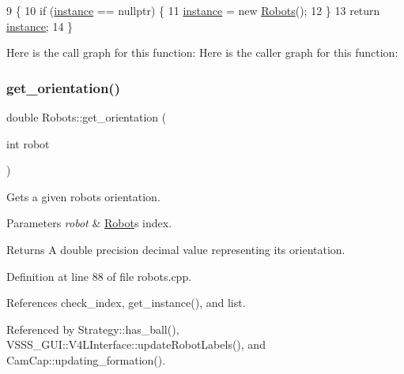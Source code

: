 \begin{DoxyCode}
9                              \{
10     \textcolor{keywordflow}{if} (\hyperlink{class_robots_acd8ab9afe75178be7d696cf2c1b96056}{instance} == \textcolor{keyword}{nullptr}) \{
11         \hyperlink{class_robots_acd8ab9afe75178be7d696cf2c1b96056}{instance} = \textcolor{keyword}{new} \hyperlink{class_robots_aa2745a48ebd3e52b9a3020f6afbcb25d}{Robots}();
12     \}
13     \textcolor{keywordflow}{return} \hyperlink{class_robots_acd8ab9afe75178be7d696cf2c1b96056}{instance};
14 \}
\end{DoxyCode}
Here is the call graph for this function\+:
Here is the caller graph for this function\+:
\mbox{\label{class_robots_ae1d0829c1089322c8fac5830f65b13a0}} 
\subsubsection{\texorpdfstring{get\+\_\+orientation()}{get\_orientation()}}
{\footnotesize\ttfamily double Robots\+::get\+\_\+orientation (\begin{DoxyParamCaption}\item[{int}]{robot }\end{DoxyParamCaption})\hspace{0.3cm}{\ttfamily [static]}}

Gets a given robot\textquotesingle{}s orientation. 
\begin{DoxyParams}{Parameters}
{\em robot} & \hyperlink{struct_robots_1_1_robot}{Robot}\textquotesingle{}s index. \\
\hline
\end{DoxyParams}
\begin{DoxyReturn}{Returns}
A double precision decimal value representing it\textquotesingle{}s orientation. 
\end{DoxyReturn}


Definition at line 88 of file robots.\+cpp.



References check\+\_\+index, get\+\_\+instance(), and list.



Referenced by Strategy\+::has\+\_\+ball(), V\+S\+S\+S\+\_\+\+G\+U\+I\+::\+V4\+L\+Interface\+::update\+Robot\+Labels(), and Cam\+Cap\+::updating\+\_\+formation().


